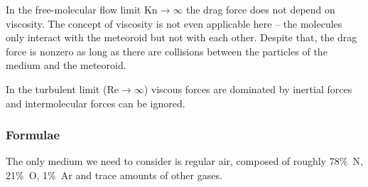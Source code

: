         In the free-molecular flow limit $\mathrm{Kn} \to \infty$ the drag force does not
        depend on viscosity. The concept of viscosity is not even applicable here -- the
        molecules only interact with the meteoroid but not with each other.
        Despite that, the drag force is nonzero as long as there are collisions
        between the particles of the medium and the meteoroid.

        In the turbulent limit ($\mathrm{Re} \to \infty$) viscous forces are dominated
        by inertial forces and intermolecular forces can be ignored.

        \subsubsection{Formulae} \label{fdvf}
            The only medium we need to consider is regular air, composed of roughly 78\%~N,
            21\%~O, 1\%~Ar and trace amounts of other gases.

